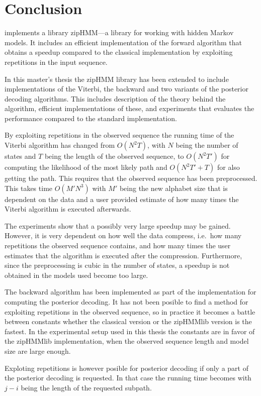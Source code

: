 \chapter{Conclusion}
\label{cha:conclusion}

\citet{sand2013ziphmmlib} implements a library zipHMM---a library for working
with hidden Markov models. It includes an efficient implementation of the forward
algorithm that obtains a speedup compared to the classical implementation by
exploiting repetitions in the input sequence.

In this master's thesis the zipHMM library has been extended to include
implementations of the Viterbi, the backward and two variants of the posterior
decoding algorithms. This includes description of the theory behind the
algorithm, efficient implementations of these, and experiments that evaluates
the performance compared to the standard implementation.

By exploiting repetitions in the observed sequence the running time of the
Viterbi algorithm has changed from $O(N^2 T)$, with $N$ being the number of
states and $T$ being the length of the observed sequence, to $O(N^2 T')$ for
computing the likelihood of the most likely path and $O(N^2 T' + T)$ for also
getting the path. This requires that the observed sequence has been
preprocessed. This takes time $O(M' N^3)$ with $M'$ being the new alphabet size
that is dependent on the data and a user provided estimate of how many times
the Viterbi algorithm is executed afterwards.

The experiments show that a possibly very large speedup may be gained. However,
it is very dependent on how well the data compress, i.e.\ how many repetitions
the observed sequence contains, and how many times the user estimates that the
algorithm is executed after the compression. Furthermore, since the
preprocessing is cubic in the number of states, a speedup is not obtained in
the models used become too large.

The backward algorithm has been implemented as part of the implementation for
computing the posterior decoding. It has not been posible to find a method for
exploiting repetitions in the observed sequence, so in practice it becomes a
battle between constants whether the classical version or the zipHMMlib version
is the fastest. In the experimental setup used in this thesis the constants are
in favor of the zipHMMlib implementation, when the observed sequence length and
model size are large enough.

Exploting repetitions is however posible for posterior decoding if only a
part of the posterior decoding is requested. In that case the running time
becomes  with $j - i$ being the length of the
requested subpath.

